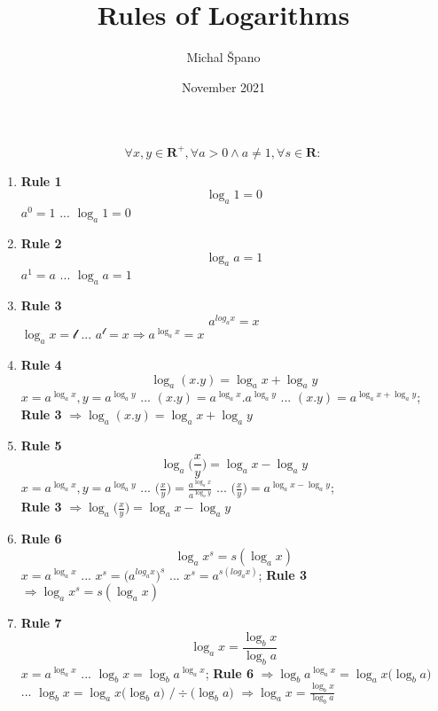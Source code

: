 \documentclass{article}
\title{Rules of Logarithms}
\author{Michal Špano}
\date{November 2021}
\begin{document}
\maketitle

\[\forall x,y \in\mathbf{R^+}, \forall a > 0 \land a \neq 1, \forall s \in\mathbf{R}:\]

\begin{enumerate}
    \item \textbf{Rule 1}
    \[\log_a 1 = 0\]
    $a^0 = 1$ ... $\log_a 1 = 0$
    
    \item \textbf{Rule 2}
    \[\log_a a = 1\]
    $a^1 = a$ ... $\log_a a = 1$
    
    \item \textbf{Rule 3}
    \[a^{log_a x} = x\]
    $\log_a x = \mathscr{l}$ ... $a^\mathscr{l} = x \Rightarrow a^{\log_a x} = x$
    
    \item \textbf{Rule 4}
    \[\log_a (x.y) = \log_a x + \log_a y\]
    $x = a^{\log_a x}, y = a^{\log_a y}$ ... $(x.y) = a^{\log_a x}.a^{\log_a y}$ ... $(x.y) = a^{\log_a x + \log_a y}$;\\ \textbf{Rule 3} $\Rightarrow \log_a (x.y) = \log_a x + \log_a y$
    
    \item \textbf{Rule 5}
    \[\log_a \Big(\frac{x}{y}\Big) = \log_a x - \log_a y\]
    $x = a^{\log_a x}, y = a^{\log_a y}$ ... $\big(\frac{x}{y}\big) = \frac{a^{\log_a x}}{a^{\log_a y}}$ ... $\big(\frac{x}{y}\big) = a^{\log_a x - \log_a y}$;\\
    \textbf{Rule 3} $\Rightarrow \log_a \Big(\frac{x}{y}\Big) = \log_a x - \log_a y$
    
    \item \textbf{Rule 6}
    \[\log_a x^s = s(\log_a x)\]
    $x = a^{\log_a x}$ ... $x^s = \big({a^{log_a x}}\big)^s$ ... $x^s = a^{s(log_a x)}$; \textbf{Rule 3} $\Rightarrow \log_a x^s = s(\log_a x)$
    
    \item \textbf{Rule 7}
    \[\log_a x = \frac{\log_b x}{\log_b a}\]
    $x = a^{\log_a x}$ ... $\log_b x = \log_b a^{\log_a x}$; \textbf{Rule 6} $\Rightarrow \log_b a^{\log_a x} = \log_a x \big(\log_b a\big)$\\... $\log_b x = \log_a x \big(\log_b a\big)$ $/\div\big(\log_b a\big)$ $\Rightarrow \log_a x = \frac{\log_b x}{\log_b a}$
    
\end{enumerate}
\end{document}
